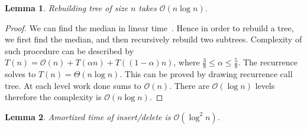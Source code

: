 \documentclass[10pt,a4paper]{article}
\newtheorem{lemma}{Lemma}
\newcommand{\Oh}{\mathcal{O}}
\begin{document}
\begin{lemma}\label{lem:1}
Rebuilding tree of size $n$ takes $\Oh(n \log n)$.
\end{lemma}

\begin{proof}
We can find the median in linear time~\cite{FIVE}. Hence in order to rebuild a tree, we first find the median, and then recursively rebuild two subtrees. Complexity of such procedure can be described by $T(n)=\Oh(n)+T(\alpha n)+T((1-\alpha)n)$, where $\frac{3}{8}\leq \alpha \leq \frac{5}{8}$. The recurrence solves to $T(n)=\Theta(n\log n)$. This can be proved by drawing recurrence call tree. At each level work done sums to $\Oh(n)$. There are $\Oh(\log n)$ levels therefore the complexity is $\Oh(n \log n)$.
\end{proof}

\begin{lemma}\label{lem:2}
Amortized time of insert/delete is $\Oh(\log^2 n)$.
\end{lemma}
\end{document}
